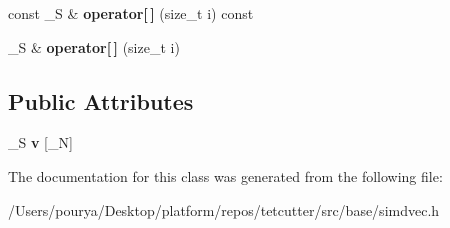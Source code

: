 \begin{DoxyCompactItemize}
\item 
\hypertarget{classps_1_1simd_1_1VecN_ad90b2f788f8ffeede7962cd8326546fa}{}const \+\_\+\+S \& {\bfseries operator\mbox{[}$\,$\mbox{]}} (size\+\_\+t i) const \label{classps_1_1simd_1_1VecN_ad90b2f788f8ffeede7962cd8326546fa}

\item 
\hypertarget{classps_1_1simd_1_1VecN_a78b8b94188446e88069bb57f75c27f8d}{}\+\_\+\+S \& {\bfseries operator\mbox{[}$\,$\mbox{]}} (size\+\_\+t i)\label{classps_1_1simd_1_1VecN_a78b8b94188446e88069bb57f75c27f8d}

\end{DoxyCompactItemize}
\subsection*{Public Attributes}
\begin{DoxyCompactItemize}
\item 
\hypertarget{classps_1_1simd_1_1VecN_a5e4fe95dd353892df44a9ad508ca1994}{}\+\_\+\+S {\bfseries v} \mbox{[}\+\_\+\+N\mbox{]}\label{classps_1_1simd_1_1VecN_a5e4fe95dd353892df44a9ad508ca1994}

\end{DoxyCompactItemize}


The documentation for this class was generated from the following file\+:\begin{DoxyCompactItemize}
\item 
/\+Users/pourya/\+Desktop/platform/repos/tetcutter/src/base/simdvec.\+h\end{DoxyCompactItemize}
